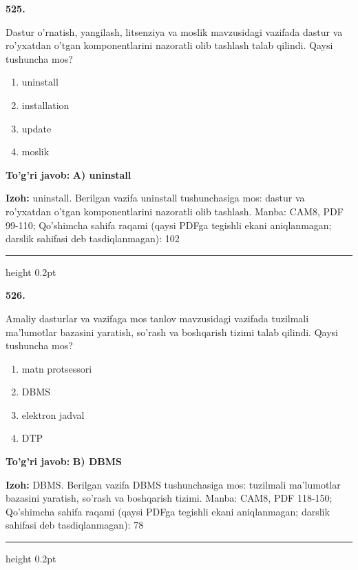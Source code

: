 \documentclass[10pt,a4paper]{article}
\begin{document}
{\bfseries\sffamily\color{ink} 525.}
\par
Dastur o'rnatish, yangilash, litsenziya va moslik mavzusidagi vazifada dastur va ro'yxatdan o'tgan komponentlarini nazoratli olib tashlash talab qilindi. Qaysi tushuncha mos?
\begin{enumerate}[label=\Alph*),leftmargin=9mm]
\item uninstall
\item installation
\item update
\item moslik
\end{enumerate}
\begin{tcolorbox}[enhanced,breakable,colback=teal!4,colframe=teal!60!black,boxrule=0.45pt,arc=1.2mm,left=2.7mm,right=2.7mm,top=1.8mm,bottom=1.8mm,before skip=2mm,after skip=2mm]
{\bfseries\sffamily\color{teal}To'g'ri javob:} \textbf{A) uninstall}
\par\smallskip
{\bfseries Izoh:} uninstall. Berilgan vazifa uninstall tushunchasiga mos: dastur va ro'yxatdan o'tgan komponentlarini nazoratli olib tashlash. Manba: CAM8, PDF 99-110; Qo'shimcha sahifa raqami (qaysi PDFga tegishli ekani aniqlanmagan; darslik sahifasi deb tasdiqlanmagan): 102
\end{tcolorbox}
\vspace{2mm}\hrule height 0.2pt\vspace{3mm}

{\bfseries\sffamily\color{ink} 526.}
\par
Amaliy dasturlar va vazifaga mos tanlov mavzusidagi vazifada tuzilmali ma'lumotlar bazasini yaratish, so'rash va boshqarish tizimi talab qilindi. Qaysi tushuncha mos?
\begin{enumerate}[label=\Alph*),leftmargin=9mm]
\item matn protsessori
\item DBMS
\item elektron jadval
\item DTP
\end{enumerate}
\begin{tcolorbox}[enhanced,breakable,colback=teal!4,colframe=teal!60!black,boxrule=0.45pt,arc=1.2mm,left=2.7mm,right=2.7mm,top=1.8mm,bottom=1.8mm,before skip=2mm,after skip=2mm]
{\bfseries\sffamily\color{teal}To'g'ri javob:} \textbf{B) DBMS}
\par\smallskip
{\bfseries Izoh:} DBMS. Berilgan vazifa DBMS tushunchasiga mos: tuzilmali ma'lumotlar bazasini yaratish, so'rash va boshqarish tizimi. Manba: CAM8, PDF 118-150; Qo'shimcha sahifa raqami (qaysi PDFga tegishli ekani aniqlanmagan; darslik sahifasi deb tasdiqlanmagan): 78
\end{tcolorbox}
\vspace{2mm}\hrule height 0.2pt\vspace{3mm}
\end{document}
